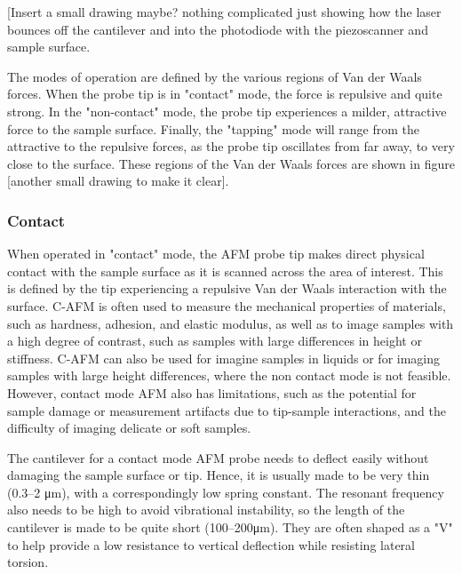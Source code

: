 [Insert a small drawing maybe? nothing complicated just showing how the laser bounces off the cantilever and into the photodiode with the piezoscanner and sample surface.

The modes of operation are defined by the various regions of Van der Waals forces. When the probe tip is in "contact" mode, the force is repulsive and quite strong. In the "non-contact" mode, the probe tip experiences a milder, attractive force to the sample surface. Finally, the "tapping" mode will range from the attractive to the repulsive forces, as the probe tip oscillates from far away, to very close to the surface. These regions of the Van der Waals forces are shown in figure [another small drawing to make it clear].


\subsubsection{Contact}
When operated in "contact" mode, the AFM probe tip makes direct physical contact with the sample surface as it is scanned across the area of interest. This is defined by the tip experiencing a repulsive Van der Waals interaction with the surface. C-AFM is often used to measure the mechanical properties of materials, such as hardness, adhesion, and elastic modulus, as well as to image samples with a high degree of contrast, such as samples with large differences in height or stiffness. C-AFM can also be used for imagine samples in liquids or for imaging samples with large height differences, where the non contact mode is not feasible. However, contact mode AFM also has limitations, such as the potential for sample damage or measurement artifacts due to tip-sample interactions, and the difficulty of imaging delicate or soft samples.

The cantilever for a contact mode AFM probe needs to deflect easily without damaging the sample surface or tip. Hence, it is usually made to be very thin (0.3--2 \si{\micro\metre}), with a correspondingly low spring constant. The resonant frequency also needs to be high to avoid vibrational instability, so the length of the cantilever is made to be quite short (100--200\si{\micro\metre}). They are often shaped as a "V" to help provide a low resistance to vertical deflection while resisting lateral torsion.

